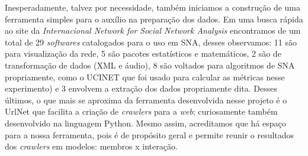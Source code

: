 Inesperadamente, talvez por necessidade, também iniciamos a construção de uma
ferramenta simples para o auxílio na preparação dos dados. Em uma busca rápida ao
site da \emph{Internacional Network for Social Network Analysis}
\citep{INSNA2010} encontramos de um total de 29 \emph{softwares} catalogados para
o uso em SNA, desses observamos: 11 são para visualização da rede, 5 são pacotes
estatísticos e matemáticos, 2 são de transformação de dados (XML e áudio), 8 são
voltados para algoritmos de SNA propriamente, como o UCINET \citep{Borgatti2010}
que foi usado para calcular as métricas nesse experimento) e 3 envolvem a
extração dos dados propriamente dita. Desses últimos, o que mais se aproxima da
ferramenta desenvolvida nesse projeto é o UrlNet \citep{Hunscher2010} que
facilita a criação de \emph{crawlers} para a \emph{web}; curiosamente também
desenvolvido na linguagem Python. Mesmo assim, acreditamos que há espaço para a
nossa ferramenta, pois é de propósito geral e permite reunir o resultados dos
\emph{crawlers} em modelos: membros x interação.

 

